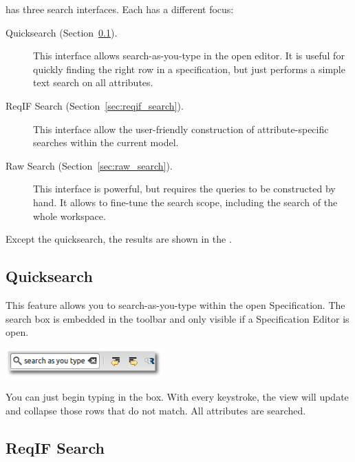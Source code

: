 {{{\pror{} has three search interfaces.  Each has a different focus:

\begin{description}
\item[Quicksearch (Section~\ref{sec:quicksearch}).] This interface allows search-as-you-type in the open editor.  It is useful for quickly finding the right row in a specification, but just performs a simple text search on all attributes.
\item[ReqIF Search (Section~\ref{sec:reqif_search}).] This interface allow the user-friendly construction of attribute-specific searches within the current model.
\item[Raw Search (Section~\ref{sec:raw_search}).] This interface is powerful, but requires the queries to be constructed by hand.  It allows to fine-tune the search scope, including the search of the whole workspace.
\end{description}

Except the quicksearch, the results are shown in the .

\subsection{Quicksearch}
\label{sec:quicksearch}

This feature allows you to search-as-you-type within the open Specification.  The search box is embedded in the toolbar and only visible if a Specification Editor is open.

\begin{center}
\includegraphics[height=3em]{../rmf-images/quicksearch.png}
\end{center}

You can just begin typing in the box.  With every keystroke, the view will update and collapse those rows that do not match.  All attributes are searched.

\subsection{ReqIF Search}

}}}
